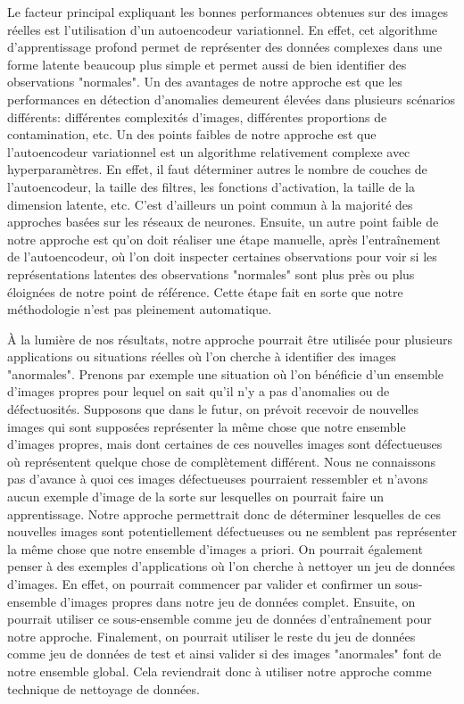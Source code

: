  Le facteur principal expliquant les bonnes performances obtenues sur des images réelles est l'utilisation d'un autoencodeur variationnel. En effet, cet algorithme d'apprentissage profond permet de représenter des données complexes dans une forme latente beaucoup plus simple et permet aussi de bien identifier des observations "normales". Un des avantages de notre approche est que les performances en détection d'anomalies demeurent élevées dans plusieurs scénarios différents: différentes complexités d'images, différentes proportions de contamination, etc. Un des points faibles de notre approche est que l'autoencodeur variationnel est un algorithme relativement complexe avec \DIFdelbegin {}\DIFdelend \DIFaddbegin {}\DIFaddend hyperparamètres. En effet, il faut déterminer \DIFdelbegin {}\DIFdelend \DIFaddbegin {}\DIFaddend autres le nombre de couches de l'autoencodeur, la taille des filtres, les fonctions d'activation, la taille de la dimension latente, etc. C'est d'ailleurs un point commun à la majorité des approches basées sur les réseaux de neurones. Ensuite, un autre point faible de notre approche est qu'on doit réaliser une étape manuelle, après l'entraînement de l'autoencodeur, où l'on doit inspecter certaines observations pour voir si les représentations latentes des observations "normales" sont plus près ou plus éloignées de notre point de référence\DIFaddbegin {}\DIFaddend . Cette étape fait en sorte que notre méthodologie n'est pas pleinement automatique.

À la lumière de nos résultats, notre approche pourrait être utilisée pour plusieurs applications ou situations réelles où l'on cherche à identifier des images "anormales". Prenons par exemple une situation où l'on bénéficie d'un ensemble d'images propres pour lequel on sait qu'il n'y a pas d'anomalies ou de défectuosités. Supposons que dans le futur, on prévoit recevoir de nouvelles images qui sont supposées représenter la même chose que notre ensemble d'images propres, mais dont certaines de ces nouvelles images sont défectueuses où représentent quelque chose de complètement différent. Nous ne connaissons pas d'avance à quoi ces images défectueuses pourraient ressembler et n'avons aucun exemple d'image de la sorte sur lesquelles on pourrait faire un apprentissage. Notre approche permettrait donc de déterminer lesquelles de ces nouvelles images sont potentiellement défectueuses ou ne semblent pas représenter la même chose que notre ensemble d'images a priori. On pourrait également penser à des exemples d'applications où l'on cherche à nettoyer un jeu de données d'images. En effet, on pourrait commencer par valider et confirmer un sous-ensemble d'images propres dans notre jeu de données complet. Ensuite, on pourrait utiliser ce sous-ensemble comme jeu de données d'entraînement pour notre approche. Finalement, on pourrait utiliser le reste du jeu de données comme jeu de données de test et ainsi valider si des images "anormales" font \DIFdelbegin {}\DIFdelend \DIFaddbegin {}\DIFaddend de notre ensemble global. Cela reviendrait donc à utiliser notre approche comme technique de nettoyage de données.

